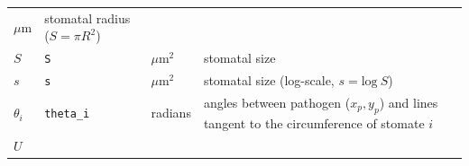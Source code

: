 \documentclass[utf8]{frontiersSCNS}
\begin{document}
\begin{longtable}[]{@{}llll@{}}
\begin{minipage}[t]{0.11\columnwidth}
\(\mu\textrm{m}\)\strut
\end{minipage} & \begin{minipage}[t]{0.59\columnwidth}\raggedright
stomatal radius (\(S = \pi R ^ 2\))\strut
\end{minipage}\tabularnewline
\begin{minipage}[t]{0.09\columnwidth}\raggedright
\(S\)\strut
\end{minipage} & \begin{minipage}[t]{0.09\columnwidth}\raggedright
\texttt{S}\strut
\end{minipage} & \begin{minipage}[t]{0.11\columnwidth}\raggedright
\(\mu\textrm{m}^2\)\strut
\end{minipage} & \begin{minipage}[t]{0.59\columnwidth}\raggedright
stomatal size\strut
\end{minipage}\tabularnewline
\begin{minipage}[t]{0.09\columnwidth}\raggedright
\(s\)\strut
\end{minipage} & \begin{minipage}[t]{0.09\columnwidth}\raggedright
\texttt{s}\strut
\end{minipage} & \begin{minipage}[t]{0.11\columnwidth}\raggedright
\(\mu\textrm{m}^2\)\strut
\end{minipage} & \begin{minipage}[t]{0.59\columnwidth}\raggedright
stomatal size (log-scale, \(s = \text{log}~S\))\strut
\end{minipage}\tabularnewline
\begin{minipage}[t]{0.09\columnwidth}\raggedright
\(\theta_i\)\strut
\end{minipage} & \begin{minipage}[t]{0.09\columnwidth}\raggedright
\texttt{theta\_i}\strut
\end{minipage} & \begin{minipage}[t]{0.11\columnwidth}\raggedright
radians\strut
\end{minipage} & \begin{minipage}[t]{0.59\columnwidth}\raggedright
angles between pathogen (\(x_p,y_p\)) and lines tangent to the
circumference of stomate \(i\)\strut
\end{minipage}\tabularnewline
\begin{minipage}[t]{0.09\columnwidth}\raggedright
\(U\)\strut
\end{minipage} & \begin{minipage}[t]{0.09\columnwidth}\raggedright

\end{minipage}
\end{longtable}
\end{document}
